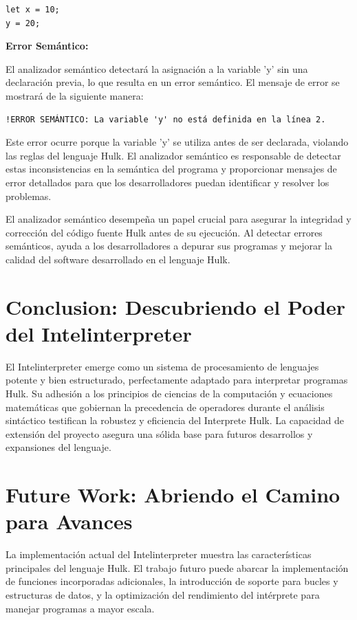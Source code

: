 \documentclass{article}
\begin{document}
\begin{verbatim}
let x = 10;
y = 20;
\end{verbatim}

\textbf{Error Semántico:}

El analizador semántico detectará la asignación a la variable 'y' sin una declaración previa, lo que resulta en un error semántico. El mensaje de error se mostrará de la siguiente manera:

\begin{verbatim}
!ERROR SEMÁNTICO: La variable 'y' no está definida en la línea 2.
\end{verbatim}

Este error ocurre porque la variable 'y' se utiliza antes de ser declarada, violando las reglas del lenguaje Hulk. El analizador semántico es responsable de detectar estas inconsistencias en la semántica del programa y proporcionar mensajes de error detallados para que los desarrolladores puedan identificar y resolver los problemas.

El analizador semántico desempeña un papel crucial para asegurar la integridad y corrección del código fuente Hulk antes de su ejecución. Al detectar errores semánticos, ayuda a los desarrolladores a depurar sus programas y mejorar la calidad del software desarrollado en el lenguaje Hulk.


\section{Conclusion: Descubriendo el Poder del  Intelinterpreter}
El Intelinterpreter emerge como un sistema de procesamiento de lenguajes potente y bien estructurado, perfectamente adaptado para interpretar programas Hulk. Su adhesión a los principios de ciencias de la computación y ecuaciones matemáticas que gobiernan la precedencia de operadores durante el análisis sintáctico testifican la robustez y eficiencia del Interprete Hulk. La capacidad de extensión del proyecto asegura una sólida base para futuros desarrollos y expansiones del lenguaje.

\section{Future Work: Abriendo el Camino para Avances}
La implementación actual del Intelinterpreter muestra las características principales del lenguaje Hulk. El trabajo futuro puede abarcar la implementación de funciones incorporadas adicionales, la introducción de soporte para bucles y estructuras de datos, y la optimización del rendimiento del intérprete para manejar programas a mayor escala.
\end{document}
